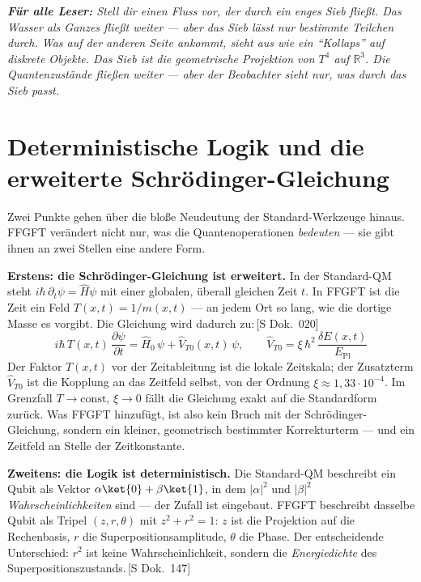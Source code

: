 \documentclass[11pt,oneside]{book}
\newcommand{\status}[1]{\penalty10000\,{\scriptsize\textcolor{gray!60}{[#1]}}}
\newenvironment{laierspur}{%
  \par\vspace{4pt}%
  \noindent\small\itshape\color{blue!60!black}%
  \textbf{Für alle Leser:}\enspace\ignorespaces}{%
  \par\vspace{4pt}\normalsize\normalfont\normalcolor}
\begin{document}
\begin{laierspur}
Stell dir einen Fluss vor, der durch ein enges Sieb fließt. Das Wasser
als Ganzes fließt weiter — aber das Sieb lässt nur bestimmte Teilchen
durch. Was auf der anderen Seite ankommt, sieht aus wie ein \enquote{Kollaps}
auf diskrete Objekte. Das Sieb ist die geometrische Projektion von $T^4$
auf $\mathbb{R}^3$. Die Quantenzustände fließen weiter — aber der
Beobachter sieht nur, was durch das Sieb passt.
\end{laierspur}

\section*{Deterministische Logik und die erweiterte Schrödinger-Gleichung}

Zwei Punkte gehen über die bloße Neudeutung der Standard-Werkzeuge hinaus.
FFGFT verändert nicht nur, was die Quantenoperationen \textit{bedeuten} ---
sie gibt ihnen an zwei Stellen eine andere Form.

\textbf{Erstens: die Schrödinger-Gleichung ist erweitert.}
In der Standard-QM steht $i\hbar\,\partial_t\psi = \hat{H}\psi$ mit einer
globalen, überall gleichen Zeit $t$. In FFGFT ist die Zeit ein Feld
$T(x,t) = 1/m(x,t)$ --- an jedem Ort so lang, wie die dortige Masse es
vorgibt. Die Gleichung wird dadurch zu:\status{S Dok.~020}
\[
  i\hbar\, T(x,t)\,\frac{\partial\psi}{\partial t}
  = \hat{H}_0\,\psi + \hat{V}_{T0}(x,t)\,\psi,
  \qquad
  \hat{V}_{T0} = \xi\,\hbar^2\,\frac{\delta E(x,t)}{E_{\mathrm{Pl}}}
\]
Der Faktor $T(x,t)$ vor der Zeitableitung ist die lokale Zeitskala;
der Zusatzterm $\hat{V}_{T0}$ ist die Kopplung an das Zeitfeld selbst,
von der Ordnung $\xi \approx 1{,}33\cdot 10^{-4}$. Im Grenzfall
$T \to \mathrm{const}$, $\xi \to 0$ fällt die Gleichung exakt auf die
Standardform zurück. Was FFGFT hinzufügt, ist also kein Bruch mit der
Schrödinger-Gleichung, sondern ein kleiner, geometrisch bestimmter
Korrekturterm --- und ein Zeitfeld an Stelle der Zeitkonstante.

\textbf{Zweitens: die Logik ist deterministisch.}
Die Standard-QM beschreibt ein Qubit als Vektor
$\alpha\ket{0}+\beta\ket{1}$, in dem $|\alpha|^2$ und $|\beta|^2$
\textit{Wahrscheinlichkeiten} sind --- der Zufall ist eingebaut.
FFGFT beschreibt dasselbe Qubit als Tripel $(z, r, \theta)$ mit
$z^2 + r^2 = 1$: $z$ ist die Projektion auf die Rechenbasis, $r$ die
Superpositionsamplitude, $\theta$ die Phase. Der entscheidende
Unterschied: $r^2$ ist keine Wahrscheinlichkeit, sondern die
\textit{Energiedichte} des Superpositionszustands.\status{S Dok.~147}
\end{document}
